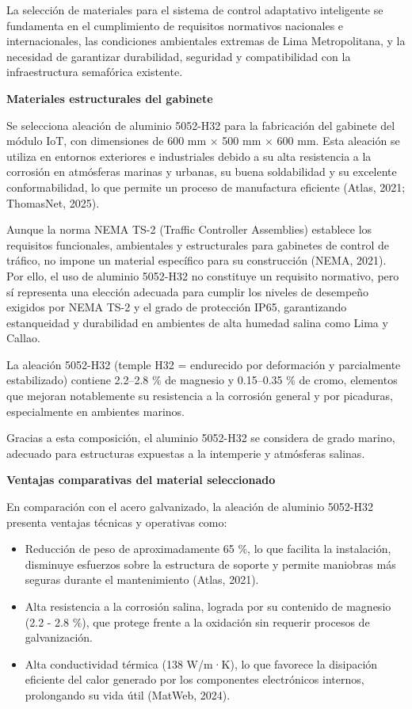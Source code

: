 \documentclass[12pt,a4paper,oneside]{report}
\begin{document}
La selección de materiales para el sistema de control adaptativo inteligente se fundamenta en el cumplimiento de requisitos normativos nacionales e internacionales, las condiciones ambientales extremas de Lima Metropolitana, y la necesidad de garantizar durabilidad, seguridad y compatibilidad con la infraestructura semafórica existente.

\textbf{Materiales estructurales del gabinete}

Se selecciona aleación de aluminio 5052-H32 para la fabricación del gabinete del módulo IoT, con dimensiones de 600 mm \ensuremath{\times} 500 mm \ensuremath{\times} 600 mm. Esta aleación se utiliza en entornos exteriores e industriales debido a su alta resistencia a la corrosión en atmósferas marinas y urbanas, su buena soldabilidad y su excelente conformabilidad, lo que permite un proceso de manufactura eficiente (Atlas, 2021; ThomasNet, 2025).

Aunque la norma NEMA TS-2 (Traffic Controller Assemblies) establece los requisitos funcionales, ambientales y estructurales para gabinetes de control de tráfico, no impone un material específico para su construcción (NEMA, 2021). Por ello, el uso de aluminio 5052-H32 no constituye un requisito normativo, pero sí representa una elección adecuada para cumplir los niveles de desempeño exigidos por NEMA TS-2 y el grado de protección IP65, garantizando estanqueidad y durabilidad en ambientes de alta humedad salina como Lima y Callao.

La aleación 5052-H32 (temple H32 = endurecido por deformación y parcialmente estabilizado) contiene 2.2--2.8 \% de magnesio y 0.15--0.35 \% de cromo, elementos que mejoran notablemente su resistencia a la corrosión general y por picaduras, especialmente en ambientes marinos.

Gracias a esta composición, el aluminio 5052-H32 se considera de grado marino, adecuado para estructuras expuestas a la intemperie y atmósferas salinas.

\textbf{Ventajas comparativas del material seleccionado}

En comparación con el acero galvanizado, la aleación de aluminio 5052-H32 presenta ventajas técnicas y operativas como:

\begin{itemize}
\item
  Reducción de peso de aproximadamente 65 \%, lo que facilita la instalación, disminuye esfuerzos sobre la estructura de soporte y permite maniobras más seguras durante el mantenimiento (Atlas, 2021).
\item
  Alta resistencia a la corrosión salina, lograda por su contenido de magnesio (2.2 - 2.8 \%), que protege frente a la oxidación sin requerir procesos de galvanización.
\item
  Alta conductividad térmica (138 W/m·K), lo que favorece la disipación eficiente del calor generado por los componentes electrónicos internos, prolongando su vida útil (MatWeb, 2024).
\end{itemize}
\end{document}
